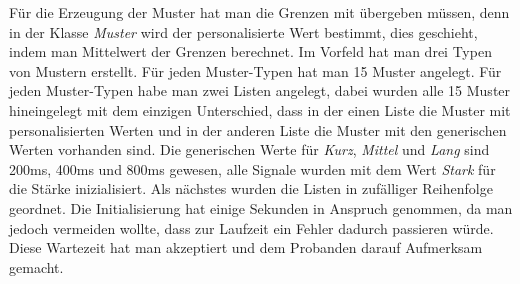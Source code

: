Für die Erzeugung der Muster hat man die Grenzen mit übergeben müssen, denn in der Klasse \textit{Muster} wird der personalisierte Wert bestimmt, dies geschieht, indem man Mittelwert der Grenzen berechnet. 
Im Vorfeld hat man drei Typen von Mustern erstellt. Für jeden Muster-Typen hat man 15 Muster angelegt. 
Für jeden Muster-Typen habe man zwei Listen angelegt, dabei wurden alle 15 Muster hineingelegt mit dem einzigen Unterschied, dass in der einen Liste die Muster mit personalisierten Werten und in der anderen Liste die Muster mit den generischen Werten vorhanden sind.
Die generischen Werte für \textit{Kurz}, \textit{Mittel} und \textit{Lang} sind 200ms, 400ms und 800ms gewesen, alle Signale wurden mit dem Wert \textit{Stark} für die Stärke inizialisiert.
Als nächstes wurden die Listen in zufälliger Reihenfolge geordnet. 
Die Initialisierung hat einige Sekunden in Anspruch genommen, da man jedoch vermeiden wollte, dass zur Laufzeit ein Fehler dadurch passieren würde. Diese Wartezeit hat man akzeptiert und dem Probanden darauf Aufmerksam gemacht.


